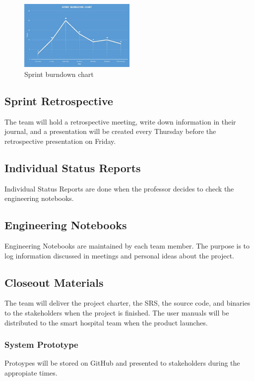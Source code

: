 \begin{figure}[h!]
    \centering
    \includegraphics[width=0.5\textwidth]{images/test_image}
    \caption{Sprint burndown chart}
\end{figure}

\subsection{Sprint Retrospective}
The team will hold a retrospective meeting, write down information in their journal, and a presentation will be created every Thursday before the retrospective presentation on Friday.

\subsection{Individual Status Reports}
Individual Status Reports are done when the professor decides to check the engineering notebooks.

\subsection{Engineering Notebooks}
Engineering Notebooks are maintained by each team member. The purpose is to log information discussed in meetings and personal ideas about the project.

\subsection{Closeout Materials}
The team will deliver the project charter, the SRS, the source code, and binaries to the stakeholders when the project is finished. The user manuals will be distributed to the smart hospital team when the product launches.

\subsubsection{System Prototype}
Protoypes will be stored on GitHub and presented to stakeholders during the appropiate times.

